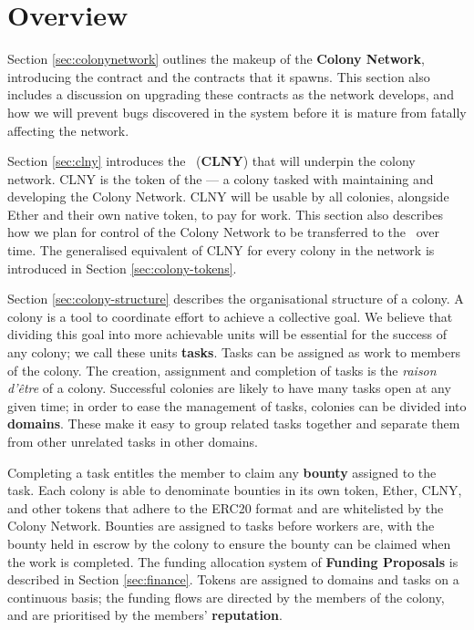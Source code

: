 \section{Overview}

Section \ref{sec:colonynetwork} outlines the makeup of the \textbf{Colony Network}, introducing the  contract and the  contracts that it spawns. This section also includes a discussion on upgrading these contracts as the network develops, and how we will prevent bugs discovered in the system before it is mature from fatally affecting the network.

Section \ref{sec:clny} introduces the \rcts\ (\textbf{CLNY}) that will underpin the colony network. CLNY is the token of the \textbf{\rc} --- a colony tasked with maintaining and developing the Colony Network. CLNY will be usable by all colonies, alongside Ether and their own native token, to pay for work. This section also describes how we plan for control of the Colony Network to be transferred to the \rc\ over time. The generalised equivalent of CLNY for every colony in the network is introduced in Section \ref{sec:colony-tokens}.

Section \ref{sec:colony-structure} describes the organisational structure of a colony. A colony is a tool to coordinate effort to achieve a collective goal. We believe that dividing this goal into more achievable units will be essential for the success of any colony; we call these units \textbf{tasks}. Tasks can be assigned as work to members of the colony. The creation, assignment and completion of tasks is the \emph{raison d'{\^e}tre} of a colony. Successful colonies are likely to have many tasks open at any given time; in order to ease the management of tasks, colonies can be divided into \textbf{domains}. These make it easy to group related tasks together and separate them from other unrelated tasks in other domains.

Completing a task entitles the member to claim any \textbf{bounty} assigned to the task. Each colony is able to denominate bounties in its own token, Ether, CLNY, and other tokens that adhere to the ERC20 format \cite{erc20} and are whitelisted by the Colony Network. Bounties are assigned to tasks before workers are, with the bounty held in escrow by the colony to ensure the bounty can be claimed when the work is completed. The funding allocation system of \textbf{Funding Proposals} is described in Section \ref{sec:finance}. Tokens are assigned to domains and tasks on a continuous basis; the funding flows are directed by the members of the colony, and are prioritised by the members' \textbf{reputation}. 

